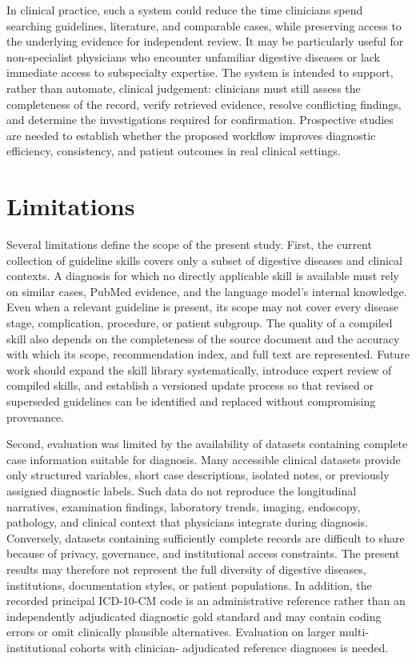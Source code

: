 \documentclass[10pt,letterpaper]{article}
\begin{document}
In clinical practice, such a system could reduce the time clinicians spend
searching guidelines, literature, and comparable cases, while preserving access
to the underlying evidence for independent review. It may be particularly useful
for non-specialist physicians who encounter unfamiliar digestive diseases or
lack immediate access to subspecialty expertise. The system is intended to
support, rather than automate, clinical judgement: clinicians must still assess
the completeness of the record, verify retrieved evidence, resolve conflicting
findings, and determine the investigations required for confirmation.
Prospective studies are needed to establish whether the proposed workflow
improves diagnostic efficiency, consistency, and patient outcomes in real
clinical settings.

\section{Limitations}

Several limitations define the scope of the present study. First, the current
collection of guideline skills covers only a subset of digestive diseases and
clinical contexts. A diagnosis for which no directly applicable skill is
available must rely on similar cases, PubMed evidence, and the language model's
internal knowledge. Even when a relevant guideline is present, its scope may not
cover every disease stage, complication, procedure, or patient subgroup. The
quality of a compiled skill also depends on the completeness of the source
document and the accuracy with which its scope, recommendation index, and full
text are represented. Future work should expand the skill library
systematically, introduce expert review of compiled skills, and establish a
versioned update process so that revised or superseded guidelines can be
identified and replaced without compromising provenance.

Second, evaluation was limited by the availability of datasets containing
complete case information suitable for diagnosis. Many accessible clinical
datasets provide only structured variables, short case descriptions, isolated
notes, or previously assigned diagnostic labels. Such data do not reproduce the
longitudinal narratives, examination findings, laboratory trends, imaging,
endoscopy, pathology, and clinical context that physicians integrate during
diagnosis. Conversely, datasets containing sufficiently complete records are
difficult to share because of privacy, governance, and institutional access
constraints. The present results may therefore not represent the full diversity
of digestive diseases, institutions, documentation styles, or patient
populations. In addition, the recorded principal ICD-10-CM code is an
administrative reference rather than an independently adjudicated diagnostic
gold standard and may contain coding errors or omit clinically plausible
alternatives. Evaluation on larger multi-institutional cohorts with clinician-
adjudicated reference diagnoses is needed.
\end{document}
